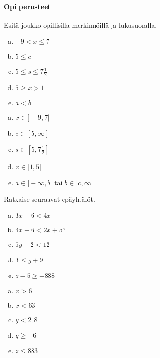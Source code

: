 \begin{tehtavasivu}

\paragraph*{Opi perusteet}

\begin{tehtava}
    Esitä joukko-opillisilla merkinnöillä ja lukusuoralla.
    \begin{enumerate}[a)]
        \item $-9<x \leq 7$
        \item $5\leq c$
        \item $5\leq s \leq 7\frac{1}{2}$
        \item $5\geq x>1$
        \item $a<b$
    \end{enumerate}
    \begin{vastaus}
        \begin{enumerate}[a)]
            \item $x \in ]-9,7]$
            \item $c \in [5,\infty]$
            \item $s \in [5,7\frac{1}{2}]$
            \item $x \in ]1,5]$
            \item $a \in ]-\infty,b[$ \quad tai \quad $b \in ]a, \infty[$
        \end{enumerate}
    \end{vastaus}
\end{tehtava}

\begin{tehtava}
    Ratkaise seuraavat epäyhtälöt.
    \begin{enumerate}[a)]
        \item $3x+6<4x$
        \item $3x-6<2x+57$
        \item $5y-2<12$
        \item $3\leq y+9$
        \item $z-5\geq-888$
    \end{enumerate}
    \begin{vastaus}
        \begin{enumerate}[a)]
            \item $x>6$
            \item $x<63$
            \item $y<2,8$
            \item $y\geq -6$
            \item $z\leq 883$
        \end{enumerate}
    \end{vastaus}
\end{tehtava}



\end{tehtavasivu}
